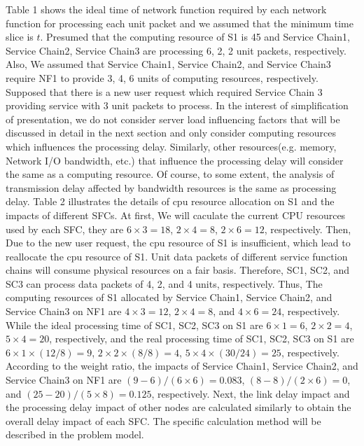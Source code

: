 \documentclass{ieeeaccess}
\begin{document}
Table 1 shows the ideal time of network function required by each network function for processing each unit packet and we assumed that the minimum time slice is $t$. Presumed that the computing resource of S1 is 45 and Service Chain1, Service Chain2, Service Chain3 are processing 6, 2, 2 unit packets, respectively. Also, We assumed that Service Chain1, Service Chain2, and Service Chain3 require NF1 to provide 3, 4, 6 units of computing resources, respectively. Supposed that there is a new user request which required Service Chain 3 providing service with 3 unit packets to process. In the interest of simplification of presentation, we do not consider server load influencing factors that will be discussed in detail in the next section and only consider computing resources which influences the processing delay. Similarly, other resources(e.g. memory, Network I/O bandwidth, etc.) that influence the processing delay will consider the same as a computing resource. Of course, to some extent, the analysis of transmission delay affected by bandwidth resources is the same as processing delay. Table 2 illustrates the details of cpu resource allocation on S1 and the impacts of different SFCs. At first, We will caculate the current CPU resources used by each SFC, they are ${6 \times 3}=18$, ${2 \times 4}=8$, ${2 \times 6}=12$, respectively. Then, Due to the new user request, the cpu resource of S1 is insufficient, which lead to reallocate the cpu resource of S1. Unit data packets of different service function chains will consume physical resources on a fair basis. Therefore, SC1, SC2, and SC3 can process data packets of 4, 2, and 4 units, respectively. Thus, The computing resources of S1 allocated by Service Chain1, Service Chain2, and Service Chain3 on NF1 are ${4 \times 3}=12$, ${2 \times 4}= 8$, and ${4 \times 6} = 24$, respectively. While the ideal processing time of SC1, SC2, SC3 on S1 are ${6 \times 1}  = 6$, ${2 \times 2=4}$, ${5 \times 4=20}$, respectively, and the real processing time of SC1, SC2, SC3 on S1 are ${6 \times 1 \times (12 / 8)} = 9$, ${2 \times 2 \times (8 / 8)} =4$, ${5 \times 4 \times (30 / 24) }=25$, respectively. According to the weight ratio, the impacts of Service Chain1, Service Chain2, and Service Chain3 on NF1 are $(9 - 6) / (6 \times 6) = 0.083$, $(8-8) / (2 \times 6) = 0 $, and $(25 - 20) / (5 \times 8) = 0.125$, respectively. Next, the link delay impact and the processing delay impact of other nodes are calculated similarly to obtain the overall delay impact of each SFC. The specific calculation method will be described in the problem model.
\end{document}
